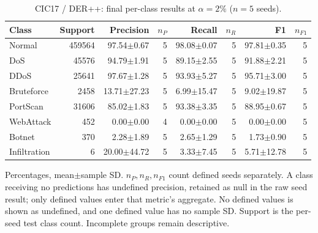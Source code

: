 \begin{table}[t]
\centering\scriptsize
\setlength{\tabcolsep}{3.3pt}
\caption{CIC17 / DER++: final per-class results at $\alpha=2\%$ ($n=5$ seeds).}\label{tab:forgetting-class-cic_ids_2017-derpp}
\begin{tabular}{lrrrrrrr}
\toprule
Class & Support & Precision & $n_P$ & Recall & $n_R$ & F1 & $n_{F1}$ \\
\midrule
Normal & 459564 & 97.54$\pm$0.67 & 5 & 98.08$\pm$0.07 & 5 & 97.81$\pm$0.35 & 5 \\
DoS & 45576 & 94.79$\pm$1.91 & 5 & 89.15$\pm$2.55 & 5 & 91.88$\pm$2.21 & 5 \\
DDoS & 25641 & 97.67$\pm$1.28 & 5 & 93.93$\pm$5.27 & 5 & 95.71$\pm$3.00 & 5 \\
Bruteforce & 2458 & 13.71$\pm$27.23 & 5 & 6.99$\pm$15.47 & 5 & 9.02$\pm$19.87 & 5 \\
PortScan & 31606 & 85.02$\pm$1.83 & 5 & 93.38$\pm$3.35 & 5 & 88.95$\pm$0.67 & 5 \\
WebAttack & 452 & 0.00$\pm$0.00 & 4 & 0.00$\pm$0.00 & 5 & 0.00$\pm$0.00 & 5 \\
Botnet & 370 & 2.28$\pm$1.89 & 5 & 2.65$\pm$1.29 & 5 & 1.73$\pm$0.90 & 5 \\
Infiltration & 6 & 20.00$\pm$44.72 & 5 & 3.33$\pm$7.45 & 5 & 5.71$\pm$12.78 & 5 \\
\bottomrule
\end{tabular}
\par\smallskip\begin{minipage}{0.98\textwidth}\scriptsize Percentages, mean$\pm$sample SD. $n_P,n_R,n_{F1}$ count defined seeds separately. A class receiving no predictions has undefined precision, retained as null in the raw seed result; only defined values enter that metric's aggregate. No defined values is shown as undefined, and one defined value has no sample SD. Support is the per-seed test class count. Incomplete groups remain descriptive.\end{minipage}
\end{table}


